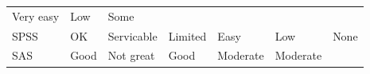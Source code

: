 \documentclass[]{book}
\begin{document}
\begin{longtable}[]{@{}lllllll@{}}
\begin{minipage}[t]{0.11\columnwidth}
Very easy\strut
\end{minipage} & \begin{minipage}[t]{0.17\columnwidth}\raggedright\strut
Low\strut
\end{minipage} & \begin{minipage}[t]{0.05\columnwidth}\raggedright\strut
Some\strut
\end{minipage}\tabularnewline
\begin{minipage}[t]{0.08\columnwidth}\raggedright\strut
SPSS\strut
\end{minipage} & \begin{minipage}[t]{0.11\columnwidth}\raggedright\strut
OK\strut
\end{minipage} & \begin{minipage}[t]{0.13\columnwidth}\raggedright\strut
Servicable\strut
\end{minipage} & \begin{minipage}[t]{0.16\columnwidth}\raggedright\strut
Limited\strut
\end{minipage} & \begin{minipage}[t]{0.11\columnwidth}\raggedright\strut
Easy\strut
\end{minipage} & \begin{minipage}[t]{0.17\columnwidth}\raggedright\strut
Low\strut
\end{minipage} & \begin{minipage}[t]{0.05\columnwidth}\raggedright\strut
None\strut
\end{minipage}\tabularnewline
\begin{minipage}[t]{0.08\columnwidth}\raggedright\strut
SAS\strut
\end{minipage} & \begin{minipage}[t]{0.11\columnwidth}\raggedright\strut
Good\strut
\end{minipage} & \begin{minipage}[t]{0.13\columnwidth}\raggedright\strut
Not great\strut
\end{minipage} & \begin{minipage}[t]{0.16\columnwidth}\raggedright\strut
Good\strut
\end{minipage} & \begin{minipage}[t]{0.11\columnwidth}\raggedright\strut
Moderate\strut
\end{minipage} & \begin{minipage}[t]{0.17\columnwidth}\raggedright\strut
Moderate\strut
\end{minipage} & \begin{minipage}[t]{0.05\columnwidth}\raggedright\strut

\end{minipage}
\end{longtable}
\end{document}
